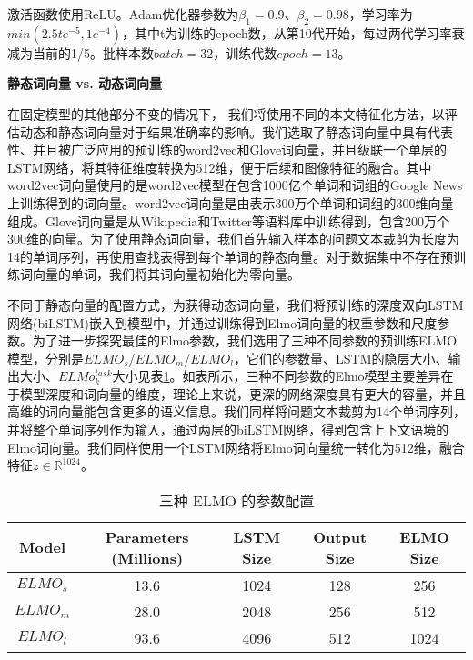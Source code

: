 激活函数使用ReLU。Adam优化器参数为$\beta_1=0.9$、$\beta_2=0.98$，学习率为$min(2.5te^{-5}, 1e^{-4})$，其中t为训练的epoch数，从第10代开始，每过两代学习率衰减为当前的1/5。批样本数$batch = 32$，训练代数$epoch=13$。

\textbf{静态词向量 vs. 动态词向量}

在固定模型的其他部分不变的情况下， 我们将使用不同的本文特征化方法，以评估动态和静态词向量对于结果准确率的影响。我们选取了静态词向量中具有代表性、并且被广泛应用的预训练的word2vec和Glove词向量，并且级联一个单层的LSTM网络，将其特征维度转换为512维，便于后续和图像特征的融合。其中word2vec词向量使用的是word2vec模型在包含1000亿个单词和词组的Google News上训练得到的词向量。word2vec词向量是由表示300万个单词和词组的300维向量组成。Glove词向量是从Wikipedia和Twitter等语料库中训练得到，包含200万个300维的向量。为了使用静态词向量，我们首先输入样本的问题文本裁剪为长度为14的单词序列，再使用查找表得到每个单词的静态向量。对于数据集中不存在预训练词向量的单词，我们将其词向量初始化为零向量。

不同于静态向量的配置方式，为获得动态词向量，我们将预训练的深度双向LSTM网络(biLSTM)嵌入到模型中，并通过训练得到Elmo词向量的权重参数和尺度参数。为了进一步探究最佳的Elmo参数，我们选用了三种不同参数的预训练ELMO模型，分别是$ELMO_s$/$ELMO_m$/$ELMO_l$，它们的参数量、LSTM的隐层大小、输出大小、$ELMo_k^{task}$大小见表\ref{ELMO_models}。如表所示，三种不同参数的Elmo模型主要差异在于模型深度和词向量的维度，理论上来说，更深的网络深度具有更大的容量，并且高维的词向量能包含更多的语义信息。我们同样将问题文本裁剪为14个单词序列，并将整个单词序列作为输入，通过两层的biLSTM网络，得到包含上下文语境的Elmo词向量。我们同样使用一个LSTM网络将Elmo词向量统一转化为512维，融合特征$z \in \mathbb{R}^{1024}$。
\begin{table}[H]
\centering
\caption{三种 ELMO 的参数配置}
\begin{tabular}{ccccc}
\toprule
\textbf{Model} & \textbf{Parameters (Millions)} & \textbf{LSTM Size} & \textbf{Output Size} & \textbf{ELMO Size}\\
\midrule
$ELMO_s$&  13.6& 1024&  128& 256\\
$ELMO_m$&  28.0& 2048&  256& 512\\
$ELMO_l$&  93.6& 4096&  512& 1024\\
\bottomrule
\end{tabular}
\label{ELMO_models}
\end{table}

